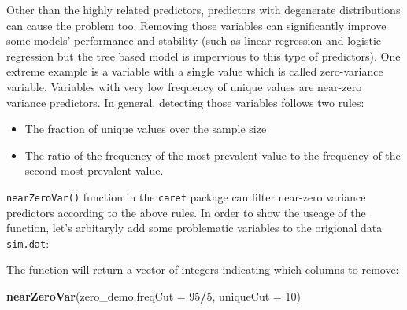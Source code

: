 \documentclass[12pt,]{krantz}
\makeatletter
\newenvironment{Shaded}{\begin{snugshade}}{\end{snugshade}}
\newcommand{\KeywordTok}[1]{\textcolor[rgb]{0.27,0.27,0.27}{\textbf{#1}}}
\newcommand{\DataTypeTok}[1]{\textcolor[rgb]{0.27,0.27,0.27}{#1}}
\newcommand{\DecValTok}[1]{\textcolor[rgb]{0.06,0.06,0.06}{#1}}
\newcommand{\CommentTok}[1]{\textcolor[rgb]{0.37,0.37,0.37}{\textit{#1}}}
\newcommand{\OperatorTok}[1]{\textcolor[rgb]{0.43,0.43,0.43}{\textbf{#1}}}
\newcommand{\NormalTok}[1]{#1}
\providecommand{\tightlist}{%
  \setlength{\itemsep}{0pt}\setlength{\parskip}{0pt}}
\newenvironment{kframe}{%
\medskip{}
\setlength{\fboxsep}{.8em}
 \def\at@end@of@kframe{}%
 \ifinner\ifhmode%
  \def\at@end@of@kframe{\end{minipage}}%
  \begin{minipage}{\columnwidth}%
 \fi\fi%
 \def\FrameCommand##1{\hskip\@totalleftmargin \hskip-\fboxsep
 \colorbox{shadecolor}{##1}\hskip-\fboxsep
     \hskip-\linewidth \hskip-\@totalleftmargin \hskip\columnwidth}%
 \MakeFramed {\advance\hsize-\width
   \@totalleftmargin\z@ \linewidth\hsize
   \@setminipage}}%
 {\par\unskip\endMakeFramed%
 \at@end@of@kframe}
\renewenvironment{Shaded}{\begin{kframe}}{\end{kframe}}
\theoremstyle{definition}
\theoremstyle{definition}
\theoremstyle{definition}
\theoremstyle{remark}
\makeatother
\begin{document}
Other than the highly related predictors, predictors with degenerate
distributions can cause the problem too. Removing those variables can
significantly improve some models' performance and stability (such as
linear regression and logistic regression but the tree based model is
impervious to this type of predictors). One extreme example is a
variable with a single value which is called zero-variance variable.
Variables with very low frequency of unique values are near-zero
variance predictors. In general, detecting those variables follows two
rules:

\begin{itemize}
\tightlist
\item
  The fraction of unique values over the sample size
\item
  The ratio of the frequency of the most prevalent value to the
  frequency of the second most prevalent value.
\end{itemize}

\texttt{nearZeroVar()} function in the \texttt{caret} package can filter
near-zero variance predictors according to the above rules. In order to
show the useage of the function, let's arbitaryly add some problematic
variables to the origional data \texttt{sim.dat}:

\begin{Shaded}
\end{Shaded}

The function will return a vector of integers indicating which columns
to remove:

\begin{Shaded}
\begin{Highlighting}[]
\KeywordTok{nearZeroVar}\NormalTok{(zero_demo,}\DataTypeTok{freqCut =} \DecValTok{95}\OperatorTok{/}\DecValTok{5}\NormalTok{, }\DataTypeTok{uniqueCut =} \DecValTok{10}\NormalTok{)}
\end{Highlighting}
\end{Shaded}
\end{document}
